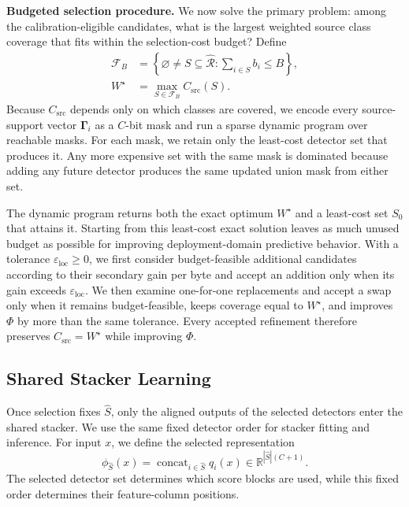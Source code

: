 \documentclass[conference]{IEEEtran}
\theoremstyle{definition}
\newcommand{\bheading}[1]{\noindent\textbf{#1.}\xspace}
\begin{document}
\bheading{Budgeted selection procedure}
We now solve the primary problem: among the calibration-eligible candidates, what is the largest weighted source class coverage that fits within the selection-cost budget?
Define
\begin{equation}
\begin{aligned}
\mathcal F_B&=\left\{
\varnothing\ne S\subseteq\widehat{\mathcal R}:
\sum_{i\in S}b_i\le B
\right\},\\
W^\star&=\max_{S\in\mathcal F_B}C_{\mathrm{src}}(S).
\end{aligned}
\label{eq:primary_value}
\end{equation}
Because $C_{\mathrm{src}}$ depends only on which classes are covered, we encode every source-support vector $\boldsymbol\Gamma_i$ as a $C$-bit mask and run a sparse dynamic program over reachable masks.
For each mask, we retain only the least-cost detector set that produces it.
Any more expensive set with the same mask is dominated because adding any future detector produces the same updated union mask from either set.

The dynamic program returns both the exact optimum $W^\star$ and a least-cost set $S_0$ that attains it.
Starting from this least-cost exact solution leaves as much unused budget as possible for improving deployment-domain predictive behavior.
With a tolerance $\varepsilon_{\mathrm{loc}}\geq 0$, we first consider budget-feasible additional candidates according to their secondary gain per byte and accept an addition only when its gain exceeds $\varepsilon_{\mathrm{loc}}$.
We then examine one-for-one replacements and accept a swap only when it remains budget-feasible, keeps coverage equal to $W^\star$, and improves $\Phi$ by more than the same tolerance.
Every accepted refinement therefore preserves $C_{\mathrm{src}}=W^\star$ while improving $\Phi$.

\subsection{Shared Stacker Learning}

Once selection fixes $\widehat S$, only the aligned outputs of the selected detectors enter the shared stacker.
We use the same fixed detector order for stacker fitting and inference.
For input $x$, we define the selected representation
\begin{equation}
\phi_{\widehat S}(x)=
\operatorname{concat}_{i\in\widehat S}q_i(x)
\in\mathbb R^{|\widehat S|(C+1)}.
\label{eq:selected_representation}
\end{equation}
The selected detector set determines which score blocks are used, while this fixed order determines their feature-column positions.
\end{document}
